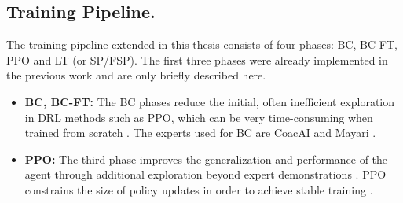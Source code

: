 \documentclass[10pt,twocolumn,letterpaper]{article}
\begin{document}
\subsection{Training Pipeline.}
The training pipeline extended in this thesis consists of four phases: BC, BC-FT, PPO and LT (or SP/FSP).
The first three phases were already implemented in the previous work \cite{huft2023microrts} and are only briefly described here.

\begin{itemize}
    \item \textbf{BC, BC-FT:} The BC phases reduce the initial, often inefficient exploration in DRL methods such as PPO, which can be very time-consuming when trained from scratch \cite{torabi2018behavioral, martin2021beclone}.
    The experts used for BC are CoacAI and Mayari \cite{huft2023microrts}.
    \item \textbf{PPO:} The third phase improves the generalization and performance of the agent through additional exploration beyond expert demonstrations \cite{martin2021beclone}.
    PPO constrains the size of policy updates in order to achieve stable training \cite{schulman2017ppo}.
    

\end{itemize}
\end{document}
